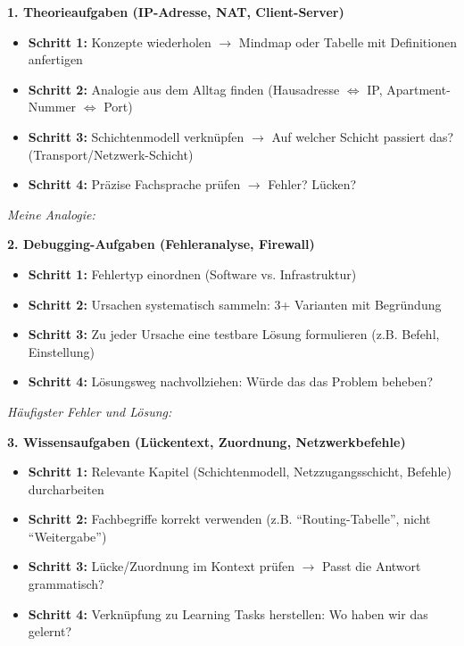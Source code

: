 \begin{mainBox}[title=Methodische Anleitung zur Durchführung der Prüfungsaufgaben]

    \small

    \textbf{\large 1. Theorieaufgaben (IP-Adresse, NAT, Client-Server)}
    \begin{itemize}[topsep=2pt, itemsep=2pt]
        \item \textbf{Schritt 1:} Konzepte wiederholen $\rightarrow$ Mindmap oder Tabelle mit Definitionen anfertigen
        \item \textbf{Schritt 2:} Analogie aus dem Alltag finden (Hausadresse $\Leftrightarrow$ IP, Apartment-Nummer $\Leftrightarrow$ Port)
        \item \textbf{Schritt 3:} Schichtenmodell verknüpfen $\rightarrow$ Auf welcher Schicht passiert das? (Transport/Netzwerk-Schicht)
        \item \textbf{Schritt 4:} Präzise Fachsprache prüfen $\rightarrow$ Fehler? Lücken?
    \end{itemize}

    \textit{Meine Analogie:} \underline{\hspace{9cm}}

    \textbf{\large 2. Debugging-Aufgaben (Fehleranalyse, Firewall)}
    \begin{itemize}[topsep=2pt, itemsep=2pt]
        \item \textbf{Schritt 1:} Fehlertyp einordnen (Software vs. Infrastruktur)
        \item \textbf{Schritt 2:} Ursachen systematisch sammeln: 3+ Varianten mit Begründung
        \item \textbf{Schritt 3:} Zu jeder Ursache eine testbare Lösung formulieren (z.B. Befehl, Einstellung)
        \item \textbf{Schritt 4:} Lösungsweg nachvollziehen: Würde das das Problem beheben?
    \end{itemize}

    \textit{Häufigster Fehler und Lösung:} \underline{\hspace{7cm}}

    \textbf{\large 3. Wissensaufgaben (Lückentext, Zuordnung, Netzwerkbefehle)}
    \begin{itemize}[topsep=2pt, itemsep=2pt]
        \item \textbf{Schritt 1:} Relevante Kapitel (Schichtenmodell, Netzzugangsschicht, Befehle) durcharbeiten
        \item \textbf{Schritt 2:} Fachbegriffe korrekt verwenden (z.B. \enquote{Routing-Tabelle}, nicht \enquote{Weitergabe})
        \item \textbf{Schritt 3:} Lücke/Zuordnung im Kontext prüfen $\rightarrow$ Passt die Antwort grammatisch?
        \item \textbf{Schritt 4:} Verknüpfung zu Learning Tasks herstellen: Wo haben wir das gelernt?
    \end{itemize}


\end{mainBox}
